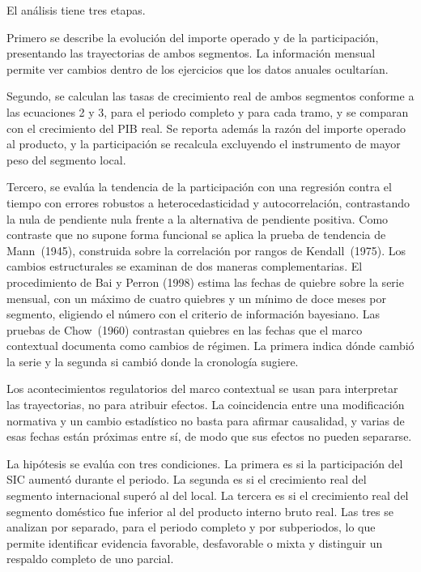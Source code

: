 
El análisis tiene tres etapas.

Primero se describe la evolución del importe operado y de la participación, presentando las trayectorias de ambos segmentos. La información mensual permite ver cambios dentro de los ejercicios que los datos anuales ocultarían.

Segundo, se calculan las tasas de crecimiento real de ambos segmentos conforme a las ecuaciones 2 y 3, para el periodo completo y para cada tramo, y se comparan con el crecimiento del PIB real. Se reporta además la razón del importe operado al producto, y la participación se recalcula excluyendo el instrumento de mayor peso del segmento local.

Tercero, se evalúa la tendencia de la participación con una regresión contra el tiempo con errores robustos a heterocedasticidad y autocorrelación, contrastando la nula de pendiente nula frente a la alternativa de pendiente positiva. Como contraste que no supone forma funcional se aplica la prueba de tendencia de Mann~(1945), construida sobre la correlación por rangos de Kendall~(1975). Los cambios estructurales se examinan de dos maneras complementarias. El procedimiento de Bai y Perron (1998) estima las fechas de quiebre sobre la serie mensual, con un máximo de cuatro quiebres y un mínimo de doce meses por segmento, eligiendo el número con el criterio de información bayesiano. Las pruebas de Chow~(1960) contrastan quiebres en las fechas que el marco contextual documenta como cambios de régimen. La primera indica dónde cambió la serie y la segunda si cambió donde la cronología sugiere.

Los acontecimientos regulatorios del marco contextual se usan para interpretar las trayectorias, no para atribuir efectos. La coincidencia entre una modificación normativa y un cambio estadístico no basta para afirmar causalidad, y varias de esas fechas están próximas entre sí, de modo que sus efectos no pueden separarse.

La hipótesis se evalúa con tres condiciones. La primera es si la participación del SIC aumentó durante el periodo. La segunda es si el crecimiento real del segmento internacional superó al del local. La tercera es si el crecimiento real del segmento doméstico fue inferior al del producto interno bruto real. Las tres se analizan por separado, para el periodo completo y por subperiodos, lo que permite identificar evidencia favorable, desfavorable o mixta y distinguir un respaldo completo de uno parcial.

